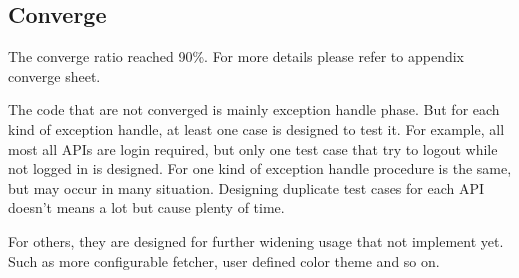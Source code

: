   \subsection{Converge}
    The converge ratio reached 90\%.
    For more details please refer to appendix converge sheet.

    The code that are not converged is mainly exception handle phase.
    But for each kind of exception handle, at least one case is designed to test it.
    For example, all most all APIs are login required,
    but only one test case that try to logout while not logged in is designed.
    For one kind of exception handle procedure is the same, but may occur in many situation.
    Designing duplicate test cases for each API doesn't means a lot but cause plenty of time.

    For others, they are designed for further widening usage that not implement yet.
    Such as more configurable fetcher, user defined color theme and so on.
